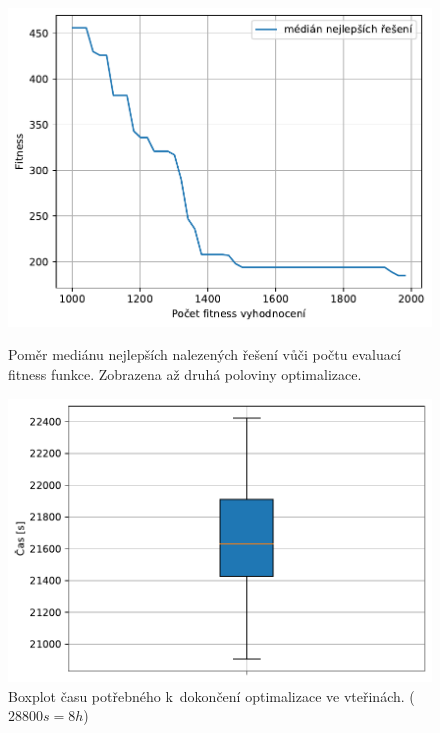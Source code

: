 \begin{figure}[H]
\begin{minipage}[t]{0.475\linewidth}
	\includegraphics[width=\textwidth]{obrazky-figures/statistics/HIFU/blob/20/TABU/bestsToFitness_1.pdf}
	\caption{Poměr mediánu nejlepších nalezených řešení vůči počtu evaluací fitness funkce.  Zobrazena až druhá poloviny optimalizace.}
	\label{fg:hifu:blob::fitPerf}
\end{minipage}
\hfill
\begin{minipage}[t]{0.475\linewidth}
\includegraphics[width=\linewidth]{obrazky-figures/statistics/HIFU/blob/20/TABU/timeBoxplot_WithOutliers.pdf}
\caption{Boxplot času potřebného k~dokončení optimalizace ve vteřinách. ($28800s = 8h$)}
\label{fg:hifu:blob:tabu:time}
\end{minipage}
\end{figure}


